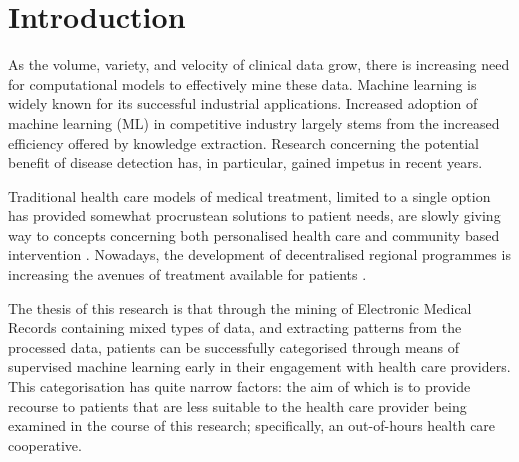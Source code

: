\chapter{Introduction}

\renewcommand\nomgroup[1]{%
  \item[\bfseries
  \ifstrequal{#1}{A}{Physics Constants}{%
  \ifstrequal{#1}{B}{Number Sets}{%
  \ifstrequal{#1}{C}{Other Symbols}{}}}%
]}



 As the volume, variety, and velocity of clinical data grow, there is increasing need for computational models to effectively mine these data. Machine learning is widely known for its successful industrial applications. Increased adoption of machine learning (ML) in competitive industry largely stems from the increased efficiency offered by knowledge extraction. Research concerning the potential benefit of disease detection has, in particular, gained impetus in recent years. 
 
 
 
 Traditional health care models of medical treatment, limited to a single option has provided somewhat procrustean solutions to patient needs, are slowly giving way to concepts concerning both personalised health care and community based intervention \cite{mahato2017paper}.
 Nowadays, the development of decentralised regional programmes is increasing the avenues of treatment available for patients \cite{iyengar2016role}. 

The thesis of this research is that through the mining of Electronic Medical Records containing mixed types of data, and extracting patterns from the processed data, patients can be successfully categorised through means of supervised machine learning early in their engagement with health care providers. This categorisation has quite narrow factors: the aim of which is to provide recourse to patients that are less suitable to the health care provider being examined in the course of this research; specifically, an out-of-hours health care cooperative.


